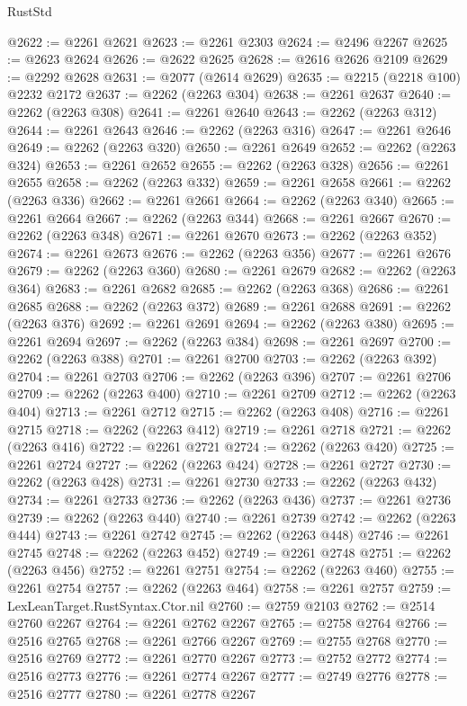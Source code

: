 \begin{lexlean}{RustStd}
\begin{coremodule}
@2622 := @2261 @2621
@2623 := @2261 @2303
@2624 := @2496 @2267
@2625 := @2623 @2624
@2626 := @2622 @2625
@2628 := @2616 @2626 @2109
@2629 := @2292 @2628
@2631 := @2077 (@2614 @2629)
@2635 := @2215 (@2218 @100) @2232 @2172
@2637 := @2262 (@2263 @304)
@2638 := @2261 @2637
@2640 := @2262 (@2263 @308)
@2641 := @2261 @2640
@2643 := @2262 (@2263 @312)
@2644 := @2261 @2643
@2646 := @2262 (@2263 @316)
@2647 := @2261 @2646
@2649 := @2262 (@2263 @320)
@2650 := @2261 @2649
@2652 := @2262 (@2263 @324)
@2653 := @2261 @2652
@2655 := @2262 (@2263 @328)
@2656 := @2261 @2655
@2658 := @2262 (@2263 @332)
@2659 := @2261 @2658
@2661 := @2262 (@2263 @336)
@2662 := @2261 @2661
@2664 := @2262 (@2263 @340)
@2665 := @2261 @2664
@2667 := @2262 (@2263 @344)
@2668 := @2261 @2667
@2670 := @2262 (@2263 @348)
@2671 := @2261 @2670
@2673 := @2262 (@2263 @352)
@2674 := @2261 @2673
@2676 := @2262 (@2263 @356)
@2677 := @2261 @2676
@2679 := @2262 (@2263 @360)
@2680 := @2261 @2679
@2682 := @2262 (@2263 @364)
@2683 := @2261 @2682
@2685 := @2262 (@2263 @368)
@2686 := @2261 @2685
@2688 := @2262 (@2263 @372)
@2689 := @2261 @2688
@2691 := @2262 (@2263 @376)
@2692 := @2261 @2691
@2694 := @2262 (@2263 @380)
@2695 := @2261 @2694
@2697 := @2262 (@2263 @384)
@2698 := @2261 @2697
@2700 := @2262 (@2263 @388)
@2701 := @2261 @2700
@2703 := @2262 (@2263 @392)
@2704 := @2261 @2703
@2706 := @2262 (@2263 @396)
@2707 := @2261 @2706
@2709 := @2262 (@2263 @400)
@2710 := @2261 @2709
@2712 := @2262 (@2263 @404)
@2713 := @2261 @2712
@2715 := @2262 (@2263 @408)
@2716 := @2261 @2715
@2718 := @2262 (@2263 @412)
@2719 := @2261 @2718
@2721 := @2262 (@2263 @416)
@2722 := @2261 @2721
@2724 := @2262 (@2263 @420)
@2725 := @2261 @2724
@2727 := @2262 (@2263 @424)
@2728 := @2261 @2727
@2730 := @2262 (@2263 @428)
@2731 := @2261 @2730
@2733 := @2262 (@2263 @432)
@2734 := @2261 @2733
@2736 := @2262 (@2263 @436)
@2737 := @2261 @2736
@2739 := @2262 (@2263 @440)
@2740 := @2261 @2739
@2742 := @2262 (@2263 @444)
@2743 := @2261 @2742
@2745 := @2262 (@2263 @448)
@2746 := @2261 @2745
@2748 := @2262 (@2263 @452)
@2749 := @2261 @2748
@2751 := @2262 (@2263 @456)
@2752 := @2261 @2751
@2754 := @2262 (@2263 @460)
@2755 := @2261 @2754
@2757 := @2262 (@2263 @464)
@2758 := @2261 @2757
@2759 := LexLeanTarget.RustSyntax.Ctor.nil
@2760 := @2759 @2103
@2762 := @2514 @2760 @2267
@2764 := @2261 @2762 @2267
@2765 := @2758 @2764
@2766 := @2516 @2765
@2768 := @2261 @2766 @2267
@2769 := @2755 @2768
@2770 := @2516 @2769
@2772 := @2261 @2770 @2267
@2773 := @2752 @2772
@2774 := @2516 @2773
@2776 := @2261 @2774 @2267
@2777 := @2749 @2776
@2778 := @2516 @2777
@2780 := @2261 @2778 @2267

\end{coremodule}
\end{lexlean}
